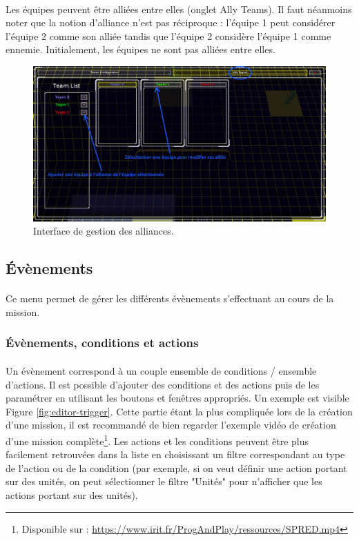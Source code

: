 \documentclass[a4paper]{article}
\begin{document}
\paragraph{ }
Les équipes peuvent être alliées entre elles (onglet Ally Teams). Il faut néanmoins noter que la notion d'alliance n'est pas réciproque : l'équipe 1 peut considérer l'équipe 2 comme son alliée tandis que l'équipe 2 considère l'équipe 1 comme ennemie. Initialement, les équipes ne sont pas alliées entre elles.
\begin{figure}[H]
\centering
\includegraphics[width=\linewidth]{editor-allyteam.png}
\caption{Interface de gestion des alliances.}
\label{fig:editor-allyteam}
\end{figure}
\subsection{Évènements}
\paragraph{ }
Ce menu permet de gérer les différents évènements s'effectuant au cours de la mission.
\subsubsection{Évènements, conditions et actions}
\paragraph{ }
Un évènement correspond à un couple ensemble de conditions / ensemble d'actions. Il est possible d'ajouter des conditions et des actions puis de les paramétrer en utilisant les boutons et fenêtres appropriés. Un exemple est visible Figure \ref{fig:editor-trigger}. Cette partie étant la plus compliquée lors de la création d'une mission, il est recommandé de bien regarder l'exemple vidéo de création d'une mission complète\footnote{Disponible sur : \url{https://www.irit.fr/ProgAndPlay/ressources/SPRED.mp4}}. Les actions et les conditions peuvent être plus facilement retrouvées dans la liste en choisissant un filtre correspondant au type de l'action ou de la condition (par exemple, si on veut définir une action portant sur des unités, on peut sélectionner le filtre "Unités" pour n'afficher que les actions portant sur des unités).
\end{document}
